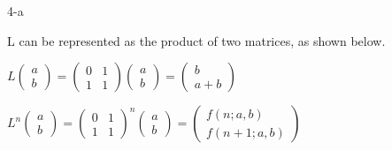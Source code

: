 \documentclass[11pt]{article}
\begin{document}
\begin{prob}{4-a}
\end{prob}
\begin{sol}

L can be represented as the product of two matrices, as shown below.
\begin{center}
$L\begin{pmatrix} a \\ b \end{pmatrix} = \begin{pmatrix} 0 & 1 \\ 1 & 1 \end{pmatrix} \begin{pmatrix} a \\ b \end{pmatrix} = \begin{pmatrix} b \\ a+b \end{pmatrix}$
\end{center}

\begin{center}
$L^{n}\begin{pmatrix} a \\ b \end{pmatrix} = \begin{pmatrix} 0 & 1 \\ 1 & 1 \end{pmatrix}^{n} \begin{pmatrix} a \\ b \end{pmatrix} = \begin{pmatrix} f(n;a,b) \\ f(n+1;a,b) \end{pmatrix}$
\end{center}
\end{sol} 
\end{document}
